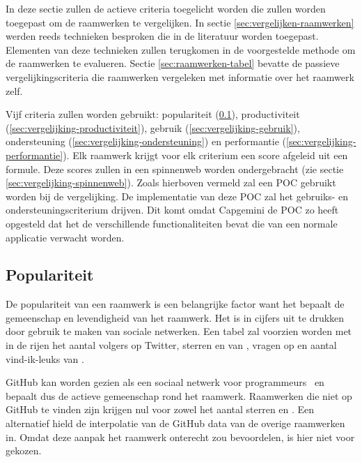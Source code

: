 In deze sectie zullen de actieve criteria toegelicht worden die zullen worden toegepast om de raamwerken te vergelijken.
In sectie \ref{sec:vergelijken-raamwerken} werden reeds technieken besproken die in de literatuur worden toegepast.
Elementen van deze technieken zullen terugkomen in de voorgestelde methode om de raamwerken te evalueren.
Sectie \ref{sec:raamwerken-tabel} bevatte de passieve vergelijkingscriteria die raamwerken vergeleken met informatie over het raamwerk zelf.

Vijf criteria zullen worden gebruikt: populariteit (\ref{sec:vergelijking-populariteit}), productiviteit (\ref{sec:vergelijking-productiviteit}), gebruik (\ref{sec:vergelijking-gebruik}), ondersteuning (\ref{sec:vergelijking-ondersteuning}) en performantie (\ref{sec:vergelijking-performantie}). 
Elk raamwerk krijgt voor elk criterium een score afgeleid uit een formule. 
Deze scores zullen in een spinnenweb worden ondergebracht (zie sectie \ref{sec:vergelijking-spinnenweb}).
Zoals hierboven vermeld zal een POC gebruikt worden bij de vergelijking.
De implementatie van deze POC zal het gebruiks- en ondersteuningscriterium drijven.  
Dit komt omdat Capgemini de POC zo heeft opgesteld dat het de verschillende functionaliteiten bevat die van een normale applicatie verwacht worden.

\subsection{Populariteit}
\label{sec:vergelijking-populariteit}
De populariteit van een raamwerk is een belangrijke factor want het bepaalt de gemeenschap en levendigheid van het raamwerk.
Het is in cijfers uit te drukken door gebruik te maken van sociale netwerken. 
Een tabel zal voorzien worden met in de rijen het aantal volgers op Twitter, sterren en  van \gh{},  vragen op \so{} en aantal vind-ik-leuks van \fb{}.

GitHub kan worden gezien als een sociaal netwerk voor programmeurs~\cite{Catone2008} en bepaalt dus de actieve gemeenschap rond het raamwerk.
Raamwerken die niet op GitHub te vinden zijn krijgen nul voor zowel het aantal sterren en .
Een alternatief hield de interpolatie van de GitHub data van de overige raamwerken in.
Omdat deze aanpak het raamwerk onterecht zou bevoordelen, is hier niet voor gekozen.

